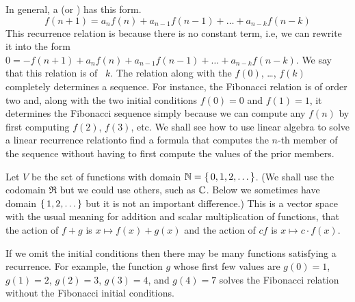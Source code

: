 In general, a 
(or )
has this form.
\begin{equation*}
  f(n+1)=a_nf(n)+a_{n-1}f(n-1)+\dots+a_{n-k}f(n-k)
\end{equation*}
This recurrence relation is 
because there is no constant term, i.e, we can rewrite it into
the form $0=-f(n+1)+a_nf(n)+a_{n-1}f(n-1)+\dots+a_{n-k}f(n-k)$.
We say that this relation is of 
~$k$.
The relation along with the 
$f(0)$, \ldots, $f(k)$
completely determines a sequence.
For instance, 
the Fibonacci relation is of order two and,  
along with the two initial conditions $f(0)=0$ and $f(1)=1$, it
determines the Fibonacci sequence simply because 
we can compute any $f(n)$ by first computing $f(2)$, $f(3)$, etc.
We shall see how to use linear algebra to solve a linear
recurrence relation\Dash to 
find a formula that computes the $n$-th member of the sequence
without having to first compute the values of the prior members.  

Let $V$ be the set of functions with domain
$\mathbb{N}=\mbox{$\{\,0,1,2,\ldots\,\}$}$. 
(We shall use the codomain $\Re$ but 
we could use others, such as $\mathbb{C}$.
Below we sometimes have domain $\mbox{$\{\,1,2,\ldots\,\}$}$
but it is not an important difference.)
This is a vector space with the usual meaning for addition and
scalar multiplication of functions, that
the action of $f+g$ is $x\mapsto f(x)+g(x)$ and the action
of $cf$ is $x\mapsto c\cdot f(x)$.

If we omit the initial conditions then there may be many functions
satisfying a recurrence.
For example, the function $g$ whose first few values 
are $g(0)=1$, $g(1)=2$, $g(2)=3$, $g(3)=4$, and
$g(4)=7$
solves the Fibonacci relation without the Fibonacci initial conditions.

